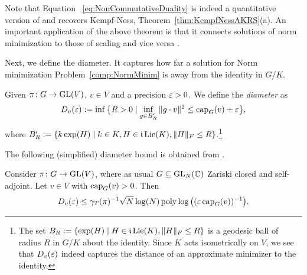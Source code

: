 Note that Equation ~\eqref{eq:NonCommutativeDuality} is indeed a quantitative version of and recovers Kempf-Ness, Theorem~\ref{thm:KempfNessAKRS}(a). An important application of the above theorem is that it connects solutions of norm minimization to those of scaling and vice versa \cite[Corollary~1.18]{GradflowArXiv}.

Next, we define the diameter. It captures how far a solution for Norm minimization Problem~\ref{comp:NormMinim} is away from the identity in $G/K$.

\begin{defn} \label{defn:Diameter}
	Given $\pi \colon G \to \operatorname{GL}(V)$, $v \in V$ and a precision $\varepsilon > 0$. We define the \emph{diameter} as
		\[ D_v(\varepsilon) := \inf \big\{ R > 0 \mid \inf_{g \in B'_R} \|g \cdot v\|^2 \leq \operatorname{cap}_G(v) + \varepsilon \big\}, \]
	where $B'_R := \{ k \exp(H) \mid k \in K, H \in \mathfrak{i} \operatorname{Lie}(K), \|H\|_F \leq R \}$.\footnote{The set $B_R := \{ \exp(H) \mid H \in \mathfrak{i} \operatorname{Lie}(K), \|H\|_F \leq R \}$ is a geodesic ball of radius $R$ in $G/K$ about the identity. Since $K$ acts isometrically on $V$, we see that $D_v(\varepsilon)$ indeed captures the distance of an approximate minimizer to the identity.}
	\hfill{}
\end{defn} %

The following (simplified) diameter bound is obtained from \cite{GradflowArXiv}.

\begin{theorem}\label{thm:DiameterViaWeightMargin}
	Consider $\pi \colon G \to \operatorname{GL}(V)$, where as usual $G \subseteq \operatorname{GL}_N(\mathbb C)$ Zariski closed and self-adjoint. Let $v \in V$ with $\operatorname{cap}_G(v) > 0$. Then
		\begin{equation}\label{eq:DiameterBoundGradflow}
			D_v(\varepsilon) \leq \gamma_{T}(\pi)^{-1} \sqrt{N} \log(N) \operatorname{poly} \log \big( (\varepsilon \operatorname{cap}_G(v))^{-1} \big) .
		\end{equation}
\end{theorem}

